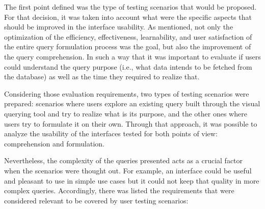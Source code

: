 The first point defined was the type of testing scenarios that would be proposed. For that decision, it was taken into account what were the specific aspects that should be improved in the interface usability. As mentioned, not only the optimization of the efficiency, effectiveness, learnability, and user satisfaction of the entire query formulation process was the goal, but also the improvement of the query comprehension. In such a way that it was important to evaluate if users could understand the query purpose (i.e., what data intends to be fetched from the database) as well as the time they required to realize that.

Considering those evaluation requirements, two types of testing scenarios were prepared: scenarios where users explore an existing query built through the visual querying tool and try to realize what is its purpose, and the other ones where users try to formulate it on their own. Through that approach, it was possible to analyze the usability of the interfaces tested for both points of view: comprehension and formulation.

Nevertheless, the complexity of the queries presented acts as a crucial factor when the scenarios were thought out. For example, an interface could be useful and pleasant to use in simple use cases but it could not keep that quality in more complex queries. Accordingly, there was listed the requirements that were considered relevant to be covered by user testing scenarios:

